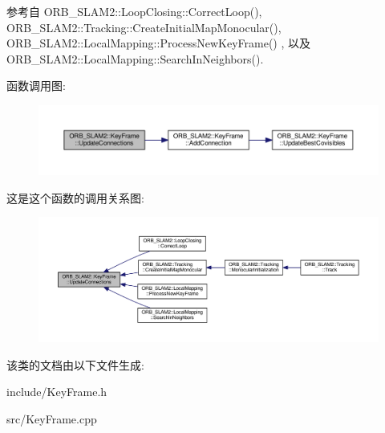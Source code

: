 参考自 O\-R\-B\-\_\-\-S\-L\-A\-M2\-::\-Loop\-Closing\-::\-Correct\-Loop(), O\-R\-B\-\_\-\-S\-L\-A\-M2\-::\-Tracking\-::\-Create\-Initial\-Map\-Monocular(), O\-R\-B\-\_\-\-S\-L\-A\-M2\-::\-Local\-Mapping\-::\-Process\-New\-Key\-Frame() , 以及 O\-R\-B\-\_\-\-S\-L\-A\-M2\-::\-Local\-Mapping\-::\-Search\-In\-Neighbors().



函数调用图\-:
\nopagebreak
\begin{figure}[H]
\begin{center}
\leavevmode
\includegraphics[width=350pt]{classORB__SLAM2_1_1KeyFrame_afe7026956c91d4e0a01812be9dc7e8d5_cgraph}
\end{center}
\end{figure}




这是这个函数的调用关系图\-:
\nopagebreak
\begin{figure}[H]
\begin{center}
\leavevmode
\includegraphics[width=350pt]{classORB__SLAM2_1_1KeyFrame_afe7026956c91d4e0a01812be9dc7e8d5_icgraph}
\end{center}
\end{figure}




该类的文档由以下文件生成\-:\begin{DoxyCompactItemize}
\item 
include/Key\-Frame.\-h\item 
src/Key\-Frame.\-cpp\end{DoxyCompactItemize}

